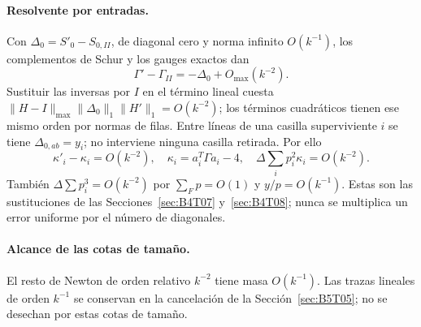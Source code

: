 \paragraph{Resolvente por entradas.}
Con $\Delta_0=S'_{0}-S_{0,II}$, de diagonal cero y norma infinito $O(k^{-1})$,
los complementos de Schur y los gauges exactos dan
\[
 \Gamma'-\Gamma_{II}=-\Delta_0+O_{\max}(k^{-2}).
\]
Sustituir las inversas por $I$ en el término lineal cuesta
$\|H-I\|_{\max}\|\Delta_0\|_1\|H'\|_1=O(k^{-2})$;
los términos cuadráticos tienen ese mismo orden por normas de filas.
Entre líneas de una casilla superviviente $i$ se tiene $\Delta_{0,ab}=y_i$;
no interviene ninguna casilla retirada. Por ello
\[
 \kappa'_i-\kappa_i=O(k^{-2}),\quad
 \kappa_i=a_i^T\Gamma a_i-4,
 \quad\Delta\sum_i p_i^2\kappa_i=O(k^{-2}).
\]
También $\Delta\sum p_i^3=O(k^{-2})$ por $\sum_Fp=O(1)$ y $y/p=O(k^{-1})$.
Estas son las sustituciones de las Secciones~\ref{sec:B4T07} y~\ref{sec:B4T08}; nunca se multiplica
un error uniforme por el número de diagonales.

\paragraph{Alcance de las cotas de tamaño.}
El resto de Newton de orden relativo $k^{-2}$ tiene masa $O(k^{-1})$.
Las trazas lineales de orden $k^{-1}$ se conservan en la cancelación de la Sección~\ref{sec:B5T05};
no se desechan por estas cotas de tamaño.
